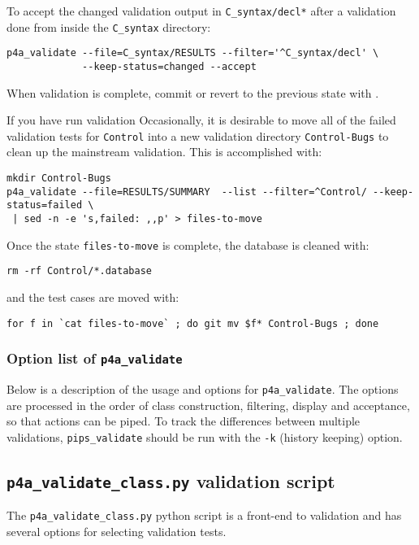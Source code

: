 \documentclass[a4paper]{article}
\begin{document}
To accept the changed validation output in \texttt{C\_syntax/decl\emph{*}}
after a validation done from inside the \verb|C_syntax| directory:
\begin{verbatim}
p4a_validate --file=C_syntax/RESULTS --filter='^C_syntax/decl' \
             --keep-status=changed --accept
\end{verbatim}
When validation is complete, commit or revert to the previous state with \Agit.

If you have run validation
Occasionally, it is desirable to move all of the failed validation tests for
\texttt{Control} into a new validation directory \texttt{Control-Bugs} to
clean up the mainstream validation. This is accomplished with:
\begin{verbatim}
mkdir Control-Bugs
p4a_validate --file=RESULTS/SUMMARY  --list --filter=^Control/ --keep-status=failed \
 | sed -n -e 's,failed: ,,p' > files-to-move
\end{verbatim}
Once the state \texttt{files-to-move} is complete, the database is
cleaned with:
\begin{verbatim}
rm -rf Control/*.database
\end{verbatim}
and the test cases are moved with:
\begin{verbatim}
for f in `cat files-to-move` ; do git mv $f* Control-Bugs ; done
\end{verbatim}


\subsubsection{Option list of \protect\texttt{p4a\_validate}}
\label{sec:opti-list-p4a_v-1}

Below is a description of the usage and options for
\verb|p4a_validate|. The options are processed in the order of class
construction, filtering, display and acceptance, so that
actions can be piped. To track the differences between
multiple validations, \verb|pips_validate| should be run with the
\texttt{-k} (history keeping) option.




\subsection{\texttt{p4a\_validate\_class.py} validation script}
\label{sec:validation_script}

The \verb|p4a_validate_class.py| python script is a front-end to \Apfa
validation and has several options for selecting validation tests.
\end{document}
